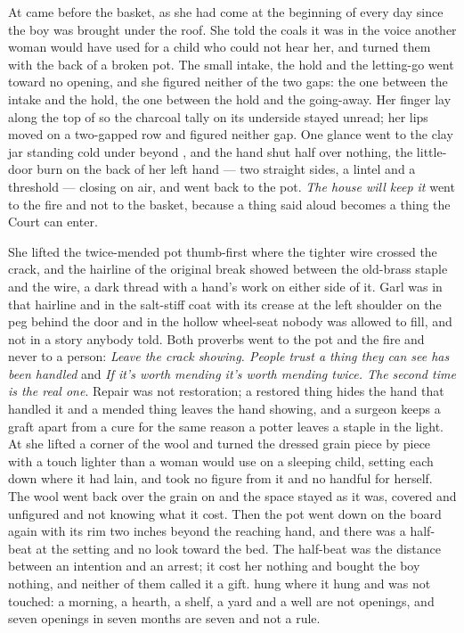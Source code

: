 At   came before the basket, as she had come at the beginning of every day since the boy was brought under the roof. She told the coals it was  in the voice another woman would have used for a child who could not hear her, and turned them with the back of a broken pot. The small intake, the hold and the letting-go went toward no opening, and she figured neither of the two gaps: the one between the intake and the hold, the one between the hold and the going-away. Her finger lay along the top of  so the charcoal tally on its underside stayed unread; her lips moved on a two-gapped row and figured neither gap. One glance went to the clay jar standing cold under  beyond , and the hand shut half over nothing, the little-door burn on the back of her left hand --- two straight sides, a lintel and a threshold --- closing on air, and went back to the pot. \emph{The house will keep it} went to the fire and not to the basket, because a thing said aloud becomes a thing the Court can enter.

She lifted the twice-mended pot thumb-first where the tighter wire crossed the crack, and the hairline of the original break showed between the old-brass staple and the wire, a dark thread with a hand's work on either side of it. Garl was in that hairline and in the salt-stiff coat with its crease at the left shoulder on the peg behind the door and in the hollow wheel-seat nobody was allowed to fill, and not in a story anybody told. Both proverbs went to the pot and the fire and never to a person: \emph{Leave the crack showing. People trust a thing they can see has been handled} and \emph{If it's worth mending it's worth mending twice. The second time is the real one}. Repair was not restoration; a restored thing hides the hand that handled it and a mended thing leaves the hand showing, and a surgeon keeps a graft apart from a cure for the same reason a potter leaves a staple in the light. At  she lifted a corner of the wool and turned the dressed grain piece by piece with a touch lighter than a woman would use on a sleeping child, setting each down where it had lain, and took no figure from it and no handful for herself. The wool went back over the grain on  and the space stayed as it was, covered and unfigured and not knowing what it cost. Then the pot went down on the board again with its rim two inches beyond the reaching hand, and there was a half-beat at the setting and no look toward the bed. The half-beat was the distance between an intention and an arrest; it cost her nothing and bought the boy nothing, and neither of them called it a gift.  hung where it hung and was not touched: a morning, a hearth, a shelf, a yard and a well are not openings, and seven openings in seven months are seven and not a rule.

